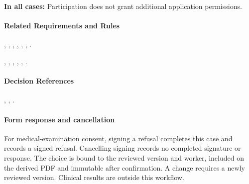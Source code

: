 \textbf{In all cases:}
Participation does not grant additional
application permissions.

\paragraph{Related Requirements and Rules}
\hyperref[fr:020]{}, \hyperref[fr:041]{}, \hyperref[fr:042]{}, \hyperref[fr:043]{}, \hyperref[fr:044]{}, \hyperref[fr:045]{}, \hyperref[fr:063]{}.

\hyperref[br:023]{}, \hyperref[br:026]{}, \hyperref[br:027]{}, \hyperref[br:028]{}, \hyperref[br:029]{}, \hyperref[br:030]{}.

\paragraph{Decision References}
, , .

\paragraph{Form response and cancellation}
For medical-examination consent, signing a refusal completes this case and records
a signed refusal. Cancelling signing records no completed signature or response.
The choice is bound to the reviewed version and worker, included on the derived
PDF and immutable after confirmation. A change requires a newly reviewed version.
Clinical results are outside this workflow.
